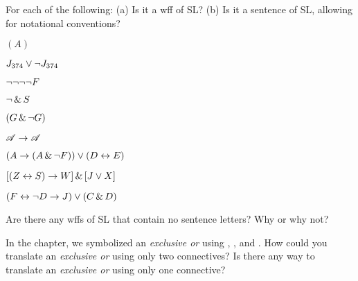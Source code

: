 \solutions
\problempart
\label{pr.wiffSL}
For each of the following: (a) Is it a wff of SL? (b) Is it a sentence of SL, allowing for notational conventions?
\begin{earg}
\item $(A)$
\item $J_{374} \vee \neg J_{374}$
\item $\neg \neg \neg \neg F$
\item $\neg \,\&\, S$
\item $(G \,\&\, \neg G)$
\item $\mathscr{A} \rightarrow \mathscr{A}$
\item $(A \rightarrow (A \,\&\, \neg F)) \vee (D \leftrightarrow E)$
\item $[(Z \leftrightarrow S) \rightarrow W] \,\&\, [J \vee X]$
\item $(F \leftrightarrow \neg D \rightarrow J) \vee (C \,\&\, D)$
\end{earg}



\problempart
\begin{earg}
\item Are there any wffs of SL that contain no sentence letters? Why or why not?
\item In the chapter, we symbolized an \emph{exclusive or} using \eor, \eand, and \enot. How could you translate an \emph{exclusive or} using only two connectives? Is there any way to translate an \emph{exclusive or} using only one connective?
\end{earg}


